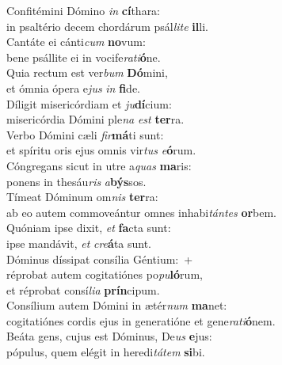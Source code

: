 \evenverse Confitémini Dómino \textit{in} \textbf{cí}thara:~\*\\
\evenverse in psaltério decem chordárum psál\textit{li}\textit{te} \textbf{il}li.\\
\oddverse Cantáte ei cánti\textit{cum} \textbf{no}vum:~\*\\
\oddverse bene psállite ei in vocife\textit{ra}\textit{ti}\textbf{ó}ne.\\
\evenverse Quia rectum est ver\textit{bum} \textbf{Dó}mini,~\*\\
\evenverse et ómnia ópera e\textit{jus} \textit{in} \textbf{fi}de.\\
\oddverse Díligit misericórdiam et \textit{ju}\textbf{dí}cium:~\*\\
\oddverse misericórdia Dómini ple\textit{na} \textit{est} \textbf{ter}ra.\\
\evenverse Verbo Dómini cæli \textit{fir}\textbf{má}ti sunt:~\*\\
\evenverse et spíritu oris ejus omnis vir\textit{tus} \textit{e}\textbf{ó}rum.\\
\oddverse Cóngregans sicut in utre a\textit{quas} \textbf{ma}ris:~\*\\
\oddverse ponens in thesáu\textit{ris} \textit{a}\textbf{býs}sos.\\
\evenverse Tímeat Dóminum om\textit{nis} \textbf{ter}ra:~\*\\
\evenverse ab eo autem commoveántur omnes inhabi\textit{tán}\textit{tes} \textbf{or}bem.\\
\oddverse Quóniam ipse dixit, \textit{et} \textbf{fa}cta sunt:~\*\\
\oddverse ipse mandávit, \textit{et} \textit{cre}\textbf{á}ta sunt.\\
\evenverse Dóminus díssipat consília Géntium:~+\\
\evenverse  réprobat autem cogitatiónes po\textit{pu}\textbf{ló}rum,~\*\\
\evenverse et réprobat consí\textit{li}\textit{a} \textbf{prín}cipum.\\
\oddverse Consílium autem Dómini in ætér\textit{num} \textbf{ma}net:~\*\\
\oddverse cogitatiónes cordis ejus in generatióne et gene\textit{ra}\textit{ti}\textbf{ó}nem.\\
\evenverse Beáta gens, cujus est Dóminus, De\textit{us} \textbf{e}jus:~\*\\
\evenverse pópulus, quem elégit in heredi\textit{tá}\textit{tem} \textbf{si}bi.\\
